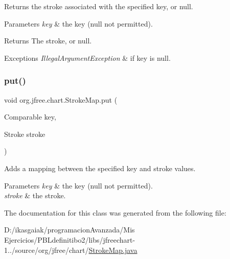 Returns the stroke associated with the specified key, or {\ttfamily null}.


\begin{DoxyParams}{Parameters}
{\em key} & the key ({\ttfamily null} not permitted).\\
\hline
\end{DoxyParams}
\begin{DoxyReturn}{Returns}
The stroke, or {\ttfamily null}.
\end{DoxyReturn}

\begin{DoxyExceptions}{Exceptions}
{\em Illegal\+Argument\+Exception} & if {\ttfamily key} is {\ttfamily null}. \\
\hline
\end{DoxyExceptions}
\mbox{\label{classorg_1_1jfree_1_1chart_1_1_stroke_map_a3863598bc78bd8ecad71744d25ec5f6a}} 
\subsubsection{\texorpdfstring{put()}{put()}}
{\footnotesize\ttfamily void org.\+jfree.\+chart.\+Stroke\+Map.\+put (\begin{DoxyParamCaption}\item[{Comparable}]{key,  }\item[{Stroke}]{stroke }\end{DoxyParamCaption})}

Adds a mapping between the specified {\ttfamily key} and {\ttfamily stroke} values.


\begin{DoxyParams}{Parameters}
{\em key} & the key ({\ttfamily null} not permitted). \\
\hline
{\em stroke} & the stroke. \\
\hline
\end{DoxyParams}


The documentation for this class was generated from the following file\+:\begin{DoxyCompactItemize}
\item 
D\+:/ikasgaiak/programacion\+Avanzada/\+Mis Ejercicios/\+P\+B\+Ldefinitibo2/libs/jfreechart-\/1../source/org/jfree/chart/\mbox{\hyperlink{_stroke_map_8java}{Stroke\+Map.\+java}}\end{DoxyCompactItemize}

